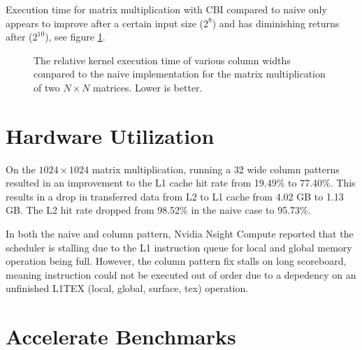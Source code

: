 Execution time for matrix multiplication with CBI compared to naive only appears to improve after a certain input size ($2^8$) and has diminishing returns after ($2^10$), see figure \ref{fig:mm_naive_vs_cbi}.

\begin{figure}[H]
    \centering
    \caption{
        The relative kernel execution time of various column widths compared to the naive implementation for the matrix multiplication of two $N \times N$ matrices. Lower is better.
    }
    \label{fig:mm_naive_vs_cbi}
\end{figure}

\section{Hardware Utilization}
On the $1024 \times 1024$ matrix multiplication, running a 32 wide column patterns resulted in an improvement to the L1 cache hit rate from 19.49\% to 77.40\%.
This results in a drop in transferred data from L2 to L1 cache from 4.02 GB to 1.13 GB. 
The L2 hit rate dropped from 98.52\% in the naive case to 95.73\%.

In both the naive and column pattern, Nvidia Nsight Compute reported that the scheduler is stalling due to the L1 instruction queue for local and global memory operation being full.
However, the column pattern fix stalls on long scoreboard, meaning instruction could not be executed out of order due to a depedency on an unfinished L1TEX (local, global, surface, tex) operation.

\section{Accelerate Benchmarks}
